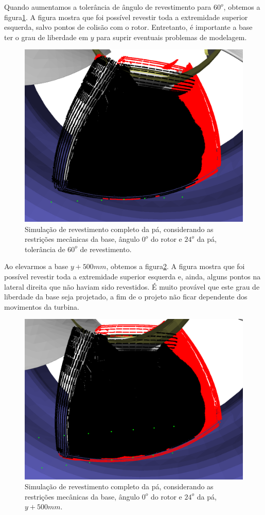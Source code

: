 Quando aumentamos a tolerância de ângulo de revestimento
para $60^o$, obtemos a figura\ref{fig::simcomp1_3}. A figura mostra que foi
possível revestir toda a extremidade superior esquerda, salvo pontos de colisão
com o rotor. Entretanto, é importante a base ter o grau de liberdade em $y$ para
suprir eventuais problemas de modelagem.

\begin{figure}[!ht]
	\centering	
	\includegraphics[width=.5\columnwidth]{figs/simcomp1_3.png}
	\caption{Simulação de revestimento completo da pá, considerando as
	restrições mecânicas da base, ângulo $0^o$ do rotor e $24^o$ da pá,
	tolerância de $60^o$ de revestimento.}
	\label{fig::simcomp1_3}
\end{figure}

Ao elevarmos a base $y+500 mm$, obtemos a figura\ref{fig::simcomp1_6}. A figura
mostra que foi possível revestir toda a extremidade superior esquerda e, ainda,
alguns pontos na lateral direita que não haviam sido revestidos. É muito
provável que este grau de liberdade da base seja projetado, a fim de o projeto
não ficar dependente dos movimentos da turbina.

\begin{figure}[!ht]
	\centering	
	\includegraphics[width=.5\columnwidth]{figs/simcomp1_6.png}
	\caption{Simulação de revestimento completo da pá, considerando as
	restrições mecânicas da base, ângulo $0^o$ do rotor e $24^o$ da pá,
	$y+500 mm$.}
	\label{fig::simcomp1_6}
\end{figure}

